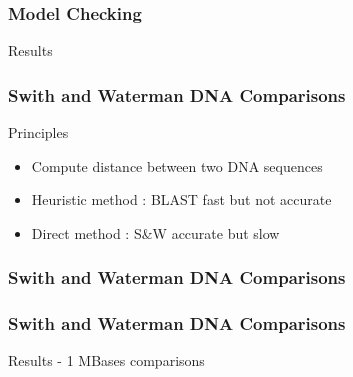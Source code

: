 \frame
{
  \frametitle{Model Checking}
  \begin{block}{Results}
  \end{block}{}

}

\frame
{
  \frametitle{Swith and Waterman DNA Comparisons}
  \begin{block}{Principles}
  \begin{itemize}
  \footnotesize
  \item Compute distance between two DNA sequences
  \item Heuristic method : BLAST fast but not accurate
  \item Direct method : S\&W accurate but slow
  \end{itemize}
  \end{block}{}
}
\frame
{
  \frametitle{Swith and Waterman DNA Comparisons}
\begin{center}\end{center}
}
\frame
{
  \frametitle{Swith and Waterman DNA Comparisons}
  \begin{block}{Results - 1 MBases comparisons}
  \end{block}{}
}
